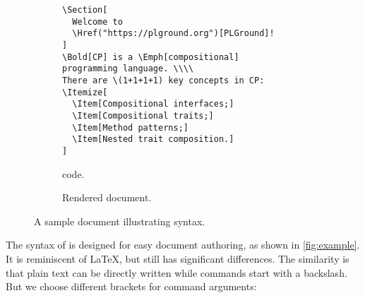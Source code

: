 \begin{figure}
\begin{subfigure}{0.58\textwidth}
\begin{Verbatim}[fontsize=\small]
\Section[
  Welcome to
  \Href("https://plground.org")[PLGround]!
]
\Bold[CP] is a \Emph[compositional]
programming language. \\\\
There are \(1+1+1+1) key concepts in CP:
\Itemize[
  \Item[Compositional interfaces;]
  \Item[Compositional traits;]
  \Item[Method patterns;]
  \Item[Nested trait composition.]
]
\end{Verbatim}
\caption{\ExT code.}
\end{subfigure}%
\begin{subfigure}{0.42\textwidth}
\vspace{1em}
\caption{Rendered document.}
\end{subfigure}
\caption{A sample document illustrating \ExT syntax.} \label{fig:example}
\end{figure}

\noindent
The syntax of \ExT is designed for easy document authoring, as shown in
\autoref{fig:example}. It is reminiscent of \LaTeX, but still has significant
differences. The similarity is that plain text can be directly written while
commands start with a backslash. But we choose different brackets for command
arguments:

